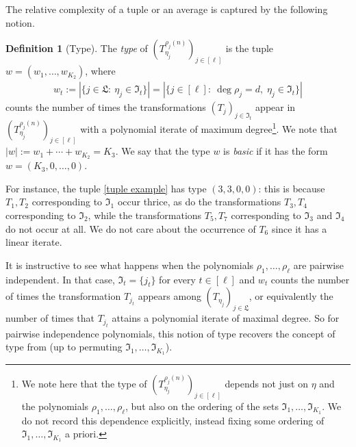 \documentclass[11pt]{amsart}
\theoremstyle{definition}
\newtheorem*{definition}{Definition}
\newcommand{\FI}{{\mathfrak I}}
\newcommand{\FL}{{\mathfrak L}}
\newcommand{\brac}[1]{\mathopen{}\left( #1 \mathclose{}\right)}
\begin{document}
The relative complexity of a tuple or an average is captured by the following notion.
\begin{definition}[Type]
The \emph{type} of $\brac{T_{\eta_j}^{\rho_j(n)}}_{j\in[\ell]}$ is the tuple $w = (w_1, \ldots, w_{K_2})$, where
\begin{align*}
    w_t := |\{j\in \FL:\ {\eta_j}\in \FI_t\}| = |\{j\in[\ell]:\ \deg \rho_j = d,\; {\eta_j}\in \FI_t\}|
\end{align*}
counts the number of times the transformations $(T_j)_{j\in \FI_t}$ appear in $\brac{T_{\eta_j}^{\rho_j(n)}}_{j\in[\ell]}$ with a polynomial iterate of maximum degree\footnote{We note here that the type of $\brac{T_{\eta_j}^{\rho_j(n)}}_{j\in[\ell]}$ depends not just on $\eta$ and the polynomials $\rho_1, \ldots, \rho_\ell$, but also on the ordering of the sets $\FI_1, \ldots, \FI_{K_1}$. We do not record this dependence explicitly, instead fixing some ordering of $\FI_1, \ldots, \FI_{K_1}$ a priori.}. We note that $|w| := w_1 +\cdots + w_{K_2} = K_3$. We say that the type $w$
is \textit{basic} if it has  the form  $w=(K_3,0,\ldots, 0)$.
\end{definition}

For instance, the tuple \eqref{tuple example} has type $(3,3,0,0)$: this is because $T_1, T_2$ corresponding to $\FI_1$ occur thrice, as do the transformations $T_3, T_4$ corresponding to $\FI_2$, while the transformations $T_5, T_7$ corresponding to $\FI_3$ and $\FI_4$ do not occur at all. We do not care about the occurrence of $T_6$ since it has a linear iterate.

It is instructive to see what happens when the polynomials $\rho_1, \ldots, \rho_\ell$ are pairwise independent. In that case, $\FI_t = \{j_t\}$ for every $t\in[\ell]$ and $w_t$ counts the number of times the transformation $T_{j_t}$ appears among $(T_{\eta_j})_{j\in \FL}$, or equivalently the number of times that $T_{j_t}$ attains a polynomial iterate of maximal degree. So for pairwise independence polynomials, this notion of type recovers the concept of type from \cite[Section 8.2]{FrKu22} (up to permuting $\FI_1, \ldots, \FI_{K_1}$).
\end{document}
